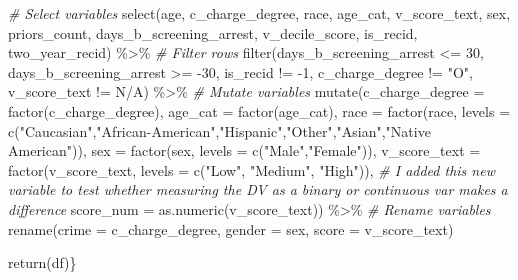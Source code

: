 \documentclass[
]{book}
\newenvironment{Shaded}{\begin{snugshade}}{\end{snugshade}}
\newcommand{\AttributeTok}[1]{\textcolor[rgb]{0.77,0.63,0.00}{#1}}
\newcommand{\CommentTok}[1]{\textcolor[rgb]{0.56,0.35,0.01}{\textit{#1}}}
\newcommand{\DecValTok}[1]{\textcolor[rgb]{0.00,0.00,0.81}{#1}}
\newcommand{\FunctionTok}[1]{\textcolor[rgb]{0.00,0.00,0.00}{#1}}
\newcommand{\NormalTok}[1]{#1}
\newcommand{\SpecialCharTok}[1]{\textcolor[rgb]{0.00,0.00,0.00}{#1}}
\newcommand{\StringTok}[1]{\textcolor[rgb]{0.31,0.60,0.02}{#1}}
\begin{document}
\begin{Shaded}
\begin{Highlighting}[]
    \CommentTok{\# Select variables }
    \FunctionTok{select}\NormalTok{(age, c\_charge\_degree, race, age\_cat, v\_score\_text, sex, priors\_count, }
\NormalTok{         days\_b\_screening\_arrest, v\_decile\_score, is\_recid, two\_year\_recid) }\SpecialCharTok{\%\textgreater{}\%}            
    \CommentTok{\# Filter rows }
    \FunctionTok{filter}\NormalTok{(days\_b\_screening\_arrest }\SpecialCharTok{\textless{}=} \DecValTok{30}\NormalTok{,}
\NormalTok{           days\_b\_screening\_arrest }\SpecialCharTok{\textgreater{}=} \SpecialCharTok{{-}}\DecValTok{30}\NormalTok{, }
\NormalTok{           is\_recid }\SpecialCharTok{!=} \SpecialCharTok{{-}}\DecValTok{1}\NormalTok{,}
\NormalTok{           c\_charge\_degree }\SpecialCharTok{!=} \StringTok{"O"}\NormalTok{,}
\NormalTok{           v\_score\_text }\SpecialCharTok{!=} \StringTok{\textquotesingle{}N/A\textquotesingle{}}\NormalTok{) }\SpecialCharTok{\%\textgreater{}\%} 
    \CommentTok{\# Mutate variables }
    \FunctionTok{mutate}\NormalTok{(}\AttributeTok{c\_charge\_degree =} \FunctionTok{factor}\NormalTok{(c\_charge\_degree),}
           \AttributeTok{age\_cat =} \FunctionTok{factor}\NormalTok{(age\_cat),}
           \AttributeTok{race =} \FunctionTok{factor}\NormalTok{(race, }\AttributeTok{levels =} \FunctionTok{c}\NormalTok{(}\StringTok{"Caucasian"}\NormalTok{,}\StringTok{"African{-}American"}\NormalTok{,}\StringTok{"Hispanic"}\NormalTok{,}\StringTok{"Other"}\NormalTok{,}\StringTok{"Asian"}\NormalTok{,}\StringTok{"Native American"}\NormalTok{)),}
           \AttributeTok{sex =} \FunctionTok{factor}\NormalTok{(sex, }\AttributeTok{levels =} \FunctionTok{c}\NormalTok{(}\StringTok{"Male"}\NormalTok{,}\StringTok{"Female"}\NormalTok{)),}
           \AttributeTok{v\_score\_text =} \FunctionTok{factor}\NormalTok{(v\_score\_text, }\AttributeTok{levels =} \FunctionTok{c}\NormalTok{(}\StringTok{"Low"}\NormalTok{, }\StringTok{"Medium"}\NormalTok{, }\StringTok{"High"}\NormalTok{)),}
\CommentTok{\# I added this new variable to test whether measuring the DV as a binary or continuous var makes a difference }
           \AttributeTok{score\_num =} \FunctionTok{as.numeric}\NormalTok{(v\_score\_text)) }\SpecialCharTok{\%\textgreater{}\%}
    \CommentTok{\# Rename variables }
    \FunctionTok{rename}\NormalTok{(}\AttributeTok{crime =}\NormalTok{ c\_charge\_degree,}
           \AttributeTok{gender =}\NormalTok{ sex,}
           \AttributeTok{score =}\NormalTok{ v\_score\_text)}
        
\FunctionTok{return}\NormalTok{(df)\}}
\end{Highlighting}
\end{Shaded}
\end{document}

